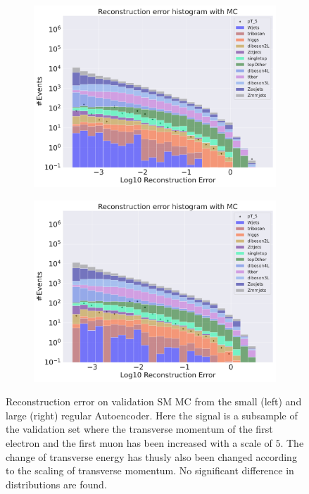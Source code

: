 \begin{figure}[H]
    \centering
    \begin{subfigure}{.45\textwidth}
        \includegraphics[width=\textwidth]{Figures/AE_testing/small/b_data_recon_big_rm3_feats_sig_pT_5.pdf}
        \caption{ }
        \label{fig:ae_small_pt_5}
    \end{subfigure}
    \hfill 
    \begin{subfigure}{.45\textwidth}
        \includegraphics[width=\textwidth]{Figures/AE_testing/big/b_data_recon_big_rm3_feats_sig_pT_5.pdf}
        \caption{}
        \label{fig:ae_big_pt_5}
    \end{subfigure}
    \hfill 
    \caption[AE | Reconstruction error $p_T$ altering of 5]{Reconstruction error on validation SM MC from the small (left) and large (right) regular Autoencoder. Here the signal is a subsample of the validation 
    set where the transverse momentum of the first electron and the first muon has been increased with a scale of $5$. The change of transverse 
    energy has thusly also been changed according to the scaling of transverse momentum. No significant difference in distributions are found. }
    \label{fig:ae_big_small_pt_5}
\end{figure}


